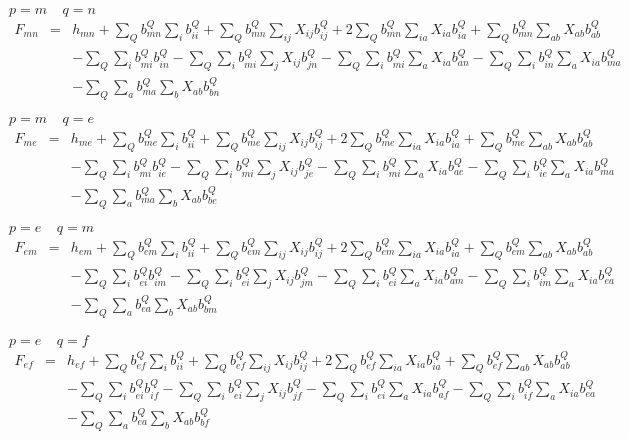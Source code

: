 \documentclass[aps,pra,groupedaddress]{revtex4-1}
\begin{document}
\newpage

$p=m \;\;\;\; q=n$
\begin{eqnarray}
F_{mn} &=& h_{mn} + \sum_Q  b_{mn}^Q \sum_i b_{ii}^Q+  \sum_Q  b_{mn}^Q  \sum_{ij} X_{ij} b_{ij}^Q +
2\sum_Q  b_{mn}^Q  \sum_{ia}   X_{ia}  b_{ia}^Q+
\sum_Q b_{mn}^Q  \sum_{ab}  X_{ab}   b_{ab}^Q \\
&& - \sum_Q  \sum_i b_{mi}^Q b_{in}^Q  
-  \sum_Q  \sum_{i} b_{mi}^Q  \sum_j X_{ij}  b_{jn}^Q 
- \sum_{Q}\sum_i  b_{mi}^Q  \sum_a X_{ia}  b_{an}^Q 
- \sum_{Q}\sum_i    b_{in}^Q  \sum_a X_{ia} b_{ma}^Q  \\
&& - \sum_{Q}\sum_a  b_{ma}^Q  \sum_b X_{ab} b_{bn}^Q 
\end{eqnarray}



$p=m \;\;\;\; q=e$
\begin{eqnarray}
F_{me} &=& h_{me} + \sum_Q  b_{me}^Q \sum_i b_{ii}^Q+  \sum_Q  b_{me}^Q  \sum_{ij} X_{ij} b_{ij}^Q +
2\sum_Q  b_{me}^Q  \sum_{ia}   X_{ia}  b_{ia}^Q+
\sum_Q b_{me}^Q  \sum_{ab}  X_{ab}   b_{ab}^Q \\
&& - \sum_Q  \sum_i b_{mi}^Q b_{ie}^Q  
-  \sum_Q  \sum_{i} b_{mi}^Q  \sum_j X_{ij}  b_{je}^Q 
- \sum_{Q}\sum_i  b_{mi}^Q  \sum_a X_{ia}  b_{ae}^Q 
- \sum_{Q}\sum_i    b_{ie}^Q  \sum_a X_{ia} b_{ma}^Q  \\
&& - \sum_{Q}\sum_a  b_{ma}^Q  \sum_b X_{ab} b_{be}^Q 
\end{eqnarray}

$p=e \;\;\;\; q=m$
\begin{eqnarray}
F_{em}&=& h_{em} + \sum_Q  b_{em}^Q \sum_i b_{ii}^Q+  \sum_Q  b_{em}^Q  \sum_{ij} X_{ij} b_{ij}^Q +
2\sum_Q  b_{em}^Q  \sum_{ia}   X_{ia}  b_{ia}^Q+
\sum_Q b_{em}^Q  \sum_{ab}  X_{ab}   b_{ab}^Q \\
&& - \sum_Q  \sum_i b_{ei}^Q b_{im}^Q  
-  \sum_Q  \sum_{i} b_{ei}^Q  \sum_j X_{ij}  b_{jm}^Q 
- \sum_{Q}\sum_i  b_{ei}^Q  \sum_a X_{ia}  b_{am}^Q 
- \sum_{Q}\sum_i    b_{im}^Q  \sum_a X_{ia} b_{ea}^Q  \\
&& - \sum_{Q}\sum_a  b_{ea}^Q  \sum_b X_{ab} b_{bm}^Q
\end{eqnarray}


$p=e \;\;\;\; q=f$
\begin{eqnarray}
F_{ef} &=& h_{ef} + \sum_Q  b_{ef}^Q \sum_i b_{ii}^Q+  \sum_Q  b_{ef}^Q  \sum_{ij} X_{ij} b_{ij}^Q +
2\sum_Q  b_{ef}^Q  \sum_{ia}   X_{ia}  b_{ia}^Q+
\sum_Q b_{ef}^Q  \sum_{ab}  X_{ab}   b_{ab}^Q \\
&& - \sum_Q  \sum_i b_{ei}^Q b_{if}^Q  
-  \sum_Q  \sum_{i} b_{ei}^Q  \sum_j X_{ij}  b_{jf}^Q 
- \sum_{Q}\sum_i  b_{ei}^Q  \sum_a X_{ia}  b_{af}^Q 
- \sum_{Q}\sum_i    b_{if}^Q  \sum_a X_{ia} b_{ea}^Q  \\
&& - \sum_{Q}\sum_a  b_{ea}^Q  \sum_b X_{ab} b_{bf}^Q
\end{eqnarray}
\end{document}
